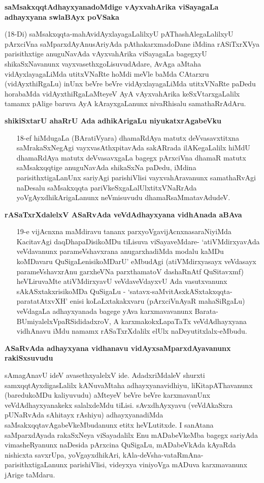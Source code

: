 \textbf{saMsakxqqtAdhayxyanadoMdige vAyxvahArika viSayagaLa adhayxyana swlaBAyx poVSaka}

(18-Di) saMsakxqqta-mahAvidAyxlayagaLalilxyU pAThashAlegaLalilxyU pArxciVna saMparxdAyAnusAriyAda pAthakarxmadoDane iMdina rASiTxrXVya parisithxtige anuguNavAda vAyxvahArika viSayagaLa bagegxyU shikaSxNavanunx vayxvasethxgoLisuvudAdare, AvAga aMtaha vidAyxlayagaLiMda utitxVNaRte hoMdi meVle baMda CAtarxru (vidAyxthiRgaLu) inUnx beVre beVre vidAyxlayagaLiMda utitxVNaRte paDedu horabaMda vidAyxthiRgaLaMteyeV AyA vAyxvahArika keSxVtarxgaLalilx tamamx pAlige baruva AyA kArayxgaLanunx nivaRhisalu samathaRrAdAru.

\textbf{shikiSxtarU ahaRrU Ada adhikArigaLu niyukatxrAgabeVku}

\begin{itemize}
\item[18-ef] hiMdugaLa (BAratiVyara) dhamaRdAya matutx deVvasavxtitxna saMrakaSxNegAgi vayxvasAthxpitavAda sakARrada ilAKegaLalilx hiMdU dhamaRdAya matutx deVvasavxgaLa bagegx pArxciVna dhamaR matutx saMsakxqqtige anuguNavAda shikaSxNa paDedu, iMdina parisithxtigaLanUnx sariyAgi parishiVlisi vayxvahAravanunx samathaRvAgi naDesalu saMsakxqqta pariVkeSxgaLalUlxtitxVNaRrAda yoVgAyxdhikArigaLanunx neVmisuvudu dhamaRsaMmatavAdudeV.
\end{itemize}

\textbf{rASaTxrXdalelxV ASaRvAda veVdAdhayxyana vidhAnada aBAva}

\begin{itemize}
\item[19-e] vijAcnxna maMdiravu tananx parxyoVgavijAcnxnasaraNiyiMda KacitavAgi daqDhapaDisikoMDu tiLisuva viSayaveMdare- `atiVMdirxyavAda veVdavanunx parameVshavxrana anugarxhadiMda modalu kaMDu koMDavaru QuSigaLenisikoMDarU' eMbudAgi (atiVMdirxyasayx veVdasayx parameVshavxrAnu garxheVNa parxthamatoV dashaRnAtf QuSitavxmf) heVLiruvaMte atiVMdirxyavU veVdaveVdayxvU Ada vasutxvanunx sAkASxtakxrisikoMDa QuSigaLu - `satavx-saMvitAsxkASxtakxqqta-paratatAtxvXH' enisi koLaLxtakakxvaru (pArxciVnAyaR mahaSiRgaLu) veVdagaLa adhayxyanada bagege yAva karxmavavanunx Barata-BUmiyalelxVpaRSididadxroV, A karxmakokxLapaTaTx veVdAdhayxyana vidhAnavu iMdu namamx rASaTxrXdalilx elUlx naDeyutitxlalx-eMbudu.
\end{itemize}

\textbf{ASaRvAda adhayxyana vidhanavu vidAyxsaMparxdAyavanunx rakiSxsuvudu}

sAmagAnavU ideV avasethxyalelxV ide. AdadxriMdaleV shurxti samxqqtAyxdigasLalilx kANuvaMtaha adhayxyanavidhiyu, liKitapAThavanunx (baredukoMDu kaliyuvudu) aMteyeV beVre beVre karxmavanUnx veVdAdhayxyanakekx salalxdeMdu tiLisi. sAvxdhAyxyavu (veVdAkaSxra pUNaRvAda sAhitayx rAshiyu) adhayxyanadiMda saMsakxqqtavAgabeVkeMbudanunx etitx heVLutitxde. I sanAtana saMparxdAyada rakaSxNeya viSayadalilx Enu mADabeVkeMba bagegx sariyAda vimasheRyanunx naDesida pArxcina QuSigaLu, mADabeVkAda kAyaRda nishicxta savxrUpa, yoVgayxdhikAri, kAla-deVsha-vataRmAna- parisithxtigaLanunx parishiVlisi, videyxya viniyoVga mADuva karxmavanunx jArige taMdaru.

